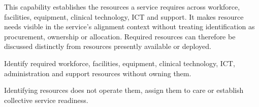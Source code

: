 This capability establishes the resources a service requires across workforce, facilities, equipment, clinical technology, ICT and support. It makes resource needs visible in the service's alignment context without treating identification as procurement, ownership or allocation. Required resources can therefore be discussed distinctly from resources presently available or deployed.



Identify required workforce, facilities, equipment, clinical technology, ICT, administration and support resources without owning them.



Identifying resources does not operate them, assign them to care or establish collective service readiness.


